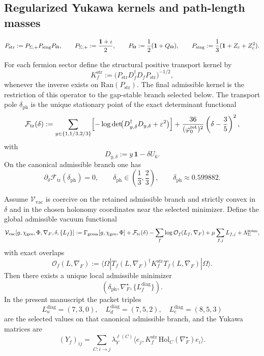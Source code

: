 \subsection{Regularized Yukawa kernels and path-length masses}

\[
P_{\mathrm{str}}:=P_{\Sigma,+}P_{\mathrm{sing}}P_\Theta,
\qquad
P_{\Sigma,+}:=\frac{\mathbf 1+\iota}{2},
\qquad
P_\Theta:=\frac12(\mathbf 1+Q_\Theta),
\qquad
P_{\mathrm{sing}}:=\frac13(\mathbf 1+Z_c+Z_c^2).
\]

\begin{definition}
For each fermion sector define the structural positive transport kernel by
\[
K_f^{\mathrm{str}}:=\bigl(P_{\mathrm{str}} D_f^\dagger D_f P_{\mathrm{str}}\bigr)^{-1/2},
\]
whenever the inverse exists on $\mathrm{Ran}(P_{\mathrm{str}})$. The final admissible kernel is
the restriction of this operator to the gap-stable branch selected below. The transport pole
$\delta_{\mathrm{ph}}$ is the unique stationary point of the exact determinant functional
\[
\mathcal F_{\mathrm{tr}}(\delta)
:=
\sum_{y\in\{1,1/3,2/3\}}
\Bigl[-\log\det\!\bigl(D_{y,\delta}^\dagger D_{y,\delta}+\varepsilon^2\bigr)\Bigr]
+
\frac{36}{(\varphi_0^{\mathrm{ret}})^2}\left(\delta-\frac35\right)^2,
\]
with
\[
D_{y,\delta}:=y\,\mathbf 1-\delta U_6.
\]
On the canonical admissible branch one has
\begin{equation}
\label{eq:transport-bridge-offset}
\partial_\delta \mathcal F_{\mathrm{tr}}(\delta_{\mathrm{ph}})=0,
\qquad
\delta_{\mathrm{ph}}\in\left(\frac13,\frac23\right),
\qquad
\delta_{\mathrm{ph}}\approx \num{0.599882}.
\end{equation}
\end{definition}

\begin{theorem}
\label{thm:exact-transport-closure}
Assume $\mathcal V_{\mathrm{vac}}$ is coercive on the retained admissible branch and strictly
convex in $\delta$ and in the chosen holonomy coordinates near the selected minimizer.
Define the global admissible vacuum functional
\[
\mathcal V_{\mathrm{vac}}[g,\chi_{\mathrm{geo}},\Phi,\nabla_F,\delta,\{L_f\}]
:=
\Gamma_{\mathrm{geom}}[g,\chi_{\mathrm{geo}},\Phi]
+\mathcal F_{\mathrm{tr}}(\delta)
-\sum_f \log \mathcal O_f(L_f,\nabla_F)
+\mu\sum_{f,j}L_{f,j}
+\Lambda_\Sigma^{\mathrm{seam}},
\]
with exact overlaps
\[
\mathcal O_f(L,\nabla_F):=
\langle\Omega|
T_f(L,\nabla_F)^\dagger
K_f^{\mathrm{str}}
T_f(L,\nabla_F)
|\Omega\rangle.
\]
Then there exists a unique local admissible minimizer
\[
(\delta_{\mathrm{ph}},\nabla_F^\star,\{L_f^{\mathrm{diag}}\}).
\]
In the present manuscript the packet triples
\[
L_u^{\mathrm{diag}}=(7,3,0),\quad
L_d^{\mathrm{diag}}=(7,5,2),\quad
L_e^{\mathrm{diag}}=(8,5,3)
\]
are the selected values on that canonical admissible branch, and the Yukawa matrices are
\[
(Y_f)_{ij}
=
\sum_{C:i\to j}\lambda_Y^{\ell(C)}
\langle e_j,K_f^{\mathrm{str}}\,\mathrm{Hol}_{C}(\nabla_F^\star)e_i\rangle.
\]
\end{theorem}

